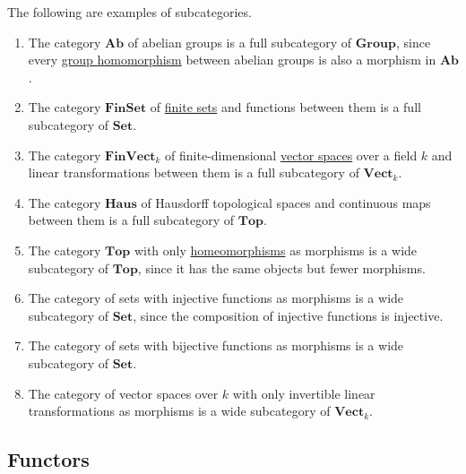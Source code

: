 	\begin{example}[Subcategories]
	  \label{ex:subcategories}
		The following are examples of subcategories.
		\begin{enumerate}
			\item The category $\mathbf{Ab}$ of abelian groups is a full subcategory of $\mathbf{Group}$, since every \hyperref[alg-def:group-homomorphism]{group homomorphism} between abelian groups is also a morphism in $\mathbf{Ab}$.
			\item The category $\mathbf{FinSet}$ of \hyperref[st-def:finite-set]{finite sets} and functions between them is a full subcategory of $\mathbf{Set}$.
			\item The category $\mathbf{FinVect}_k$ of finite-dimensional \hyperref[lin-def:vector-space]{vector spaces} over a field $k$ and linear transformations between them is a full subcategory of $\mathbf{Vect}_k$.
			\item The category $\mathbf{Haus}$ of Hausdorff topological spaces and continuous maps between them is a full subcategory of $\mathbf{Top}$.
			\item The category $\mathbf{Top}$ with only \hyperref[pst-def:homeomorphism]{homeomorphisms} as morphisms is a wide subcategory of $\mathbf{Top}$, since it has the same objects but fewer morphisms.
			\item The category of sets with injective functions as morphisms is a wide subcategory of $\mathbf{Set}$, since the composition of injective functions is injective.
			\item The category of sets with bijective functions as morphisms is a wide subcategory of $\mathbf{Set}$.
			\item The category of vector spaces over $k$ with only invertible linear transformations as morphisms is a wide subcategory of $\mathbf{Vect}_k$.
		\end{enumerate}
	\end{example}

\subsection{Functors}

